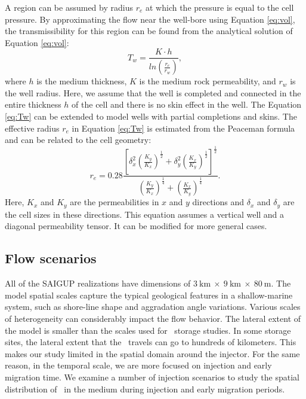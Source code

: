 A region can be assumed by radius $r_e$ at which the
pressure is equal to the cell pressure. By approximating the flow near the
well-bore using Equation \ref{eq:vol}, the transmissibility for this region can be
found from the analytical solution of Equation \ref{eq:vol}:
\begin{equation}
 T_w=\frac{K \cdot h}{ln(\frac{r_e}{r_w})},
 \label{eq:Tw}
\end{equation} where $h$ is the medium
thickness, $K$ is the medium rock permeability, and $r_{w}$ is the well radius. Here, we assume that the well is completed and connected in the entire thickness $h$ of the cell and there is no skin effect in the well. The Equation \ref{eq:Tw} can be extended to model wells with partial completions and skins. The effective radius $r_{e}$ in Equation \ref{eq:Tw} is estimated from the Peaceman formula and can be related to the cell geometry:
\begin{equation}
r_e =  0.28\frac{\left[
\delta_x^2(\frac{K_y}{K_x})^{\frac{1}{2}}+\delta_y^2(\frac{K_x}{K_y})^{\frac{1}{
2}}\right]^{\frac{1}{2}}}{(\frac{K_y}{K_x})^{\frac{1}{4}}+(\frac{K_x}{K_y})^{
\frac{1}{4}}}.
\label{eq:rinf} 
\end{equation} Here, $K_x$ and $K_y$ are the permeabilities in $x$ and $y$
directions and $\delta_x$ and $\delta_y$ are the cell sizes in these directions.
This equation assumes a vertical well and a diagonal permeability tensor. It can
be modified for more general cases.

\subsection{Flow scenarios}
\label{sec:flowScenarios}

All of the SAIGUP realizations have dimensions of $3~\mbox{km}~\times~9~\mbox{km}~\times~80~\mbox{m}$. The model spatial scales capture the typical geological features in a shallow-marine system, such as shore-line shape and aggradation angle variations. Various scales of heterogeneity can considerably impact the flow behavior. The lateral extent of the model is smaller than the scales used for \coo\ storage studies. In some storage sites, the lateral extent that the \coo\ travels can go to hundreds of kilometers. This makes our study limited in the spatial domain around the injector. For the same reason, in the temporal scale, we are more focused on injection and early migration time. We examine a number of injection scenarios to study the spatial distribution of \coo\ in the medium during injection and early migration periods.


